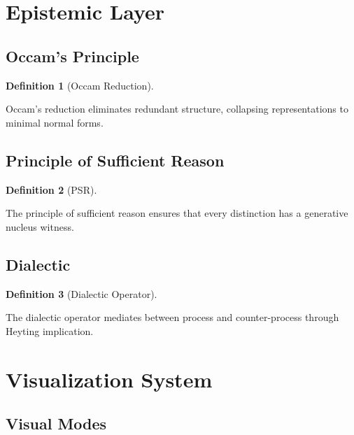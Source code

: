 \documentclass{amsart}
\theoremstyle{definition}
\newtheorem{definition}{Definition}[section]
\theoremstyle{remark}
\begin{document}
\section{Epistemic Layer}

\subsection{Occam's Principle}
\label{sec:occam}

\begin{definition}[Occam Reduction]
\label{def:occam}
\uses{}

Occam's reduction eliminates redundant structure, collapsing representations to minimal normal forms.
\end{definition}

\subsection{Principle of Sufficient Reason}
\label{sec:psr}

\begin{definition}[PSR]
\label{def:psr}
\uses{}

The principle of sufficient reason ensures that every distinction has a generative nucleus witness.
\end{definition}

\subsection{Dialectic}
\label{sec:dialectic}

\begin{definition}[Dialectic Operator]
\label{def:dialectic}
\uses{}

The dialectic operator mediates between process and counter-process through Heyting implication.
\end{definition}

\section{Visualization System}

\subsection{Visual Modes}
\label{sec:visual-modes}
\end{document}
